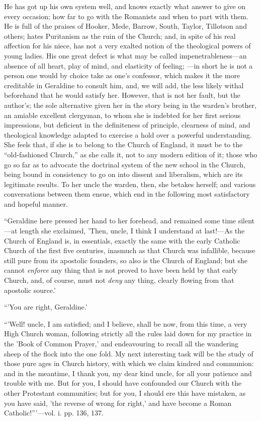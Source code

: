 He has got up his own system well, and knows
exactly what answer to give on every occasion; how far to go with the
Romanists and when to part with them. He is full of the praises of
Hooker, Mede, Barrow, South, Taylor, Tillotson and others; hates
Puritanism as the ruin of the Church; and, in spite of his real
affection for his niece, has not a very exalted notion of the
theological powers of young ladies. His one great defect is what may be
called impenetrableness—an absence of all heart, play of mind,
and elasticity of feeling; —in short he is not a person one would by
choice take as one's confessor, which makes it the more creditable in
Geraldine to consult him, and, we will add, the less likely withal
beforehand that he would satisfy her. However, that is not her fault,
but the author's; the sole alternative given her in the story being in
the warden's brother, an amiable excellent clergyman, to whom she is
indebted for her first serious impressions, but deficient in the
definiteness of principle, clearness of mind, and theological knowledge
adapted to exercise a hold over a powerful understanding. She feels
that, if she is to belong to the Church of England, it must be to the ``old-fashioned
Church,'' as she calls it, not to any modern edition of it; those who go
so far as to advocate the doctrinal system of the new school in the
Church, being bound in consistency to go on into dissent and liberalism,
which are its legitimate results. To her uncle the warden, then, she
betakes herself; and various conversations between them ensue, which end
in the following most satisfactory and hopeful manner.

``Geraldine here pressed her hand to
her forehead, and remained some time silent—at length she exclaimed, 'Then,
uncle, I think I understand at last!—As the Church of England is, in
essentials, exactly the same with the early Catholic Church of the first
five centuries, inasmuch as that Church was infallible, because still
pure from its apostolic founders, so also is the Church of England; but
she cannot \emph{enforce} any thing that is not proved to have been held
by that early Church, and, of course, must not \emph{deny} any thing,
clearly flowing from that apostolic source.'

``'You are right, Geraldine.'

``'Well! uncle, I am satisfied; and I
believe, shall be now, from this time, a very High Church woman,
following strictly all the rules laid down for my practice in the 'Book
of Common Prayer,' and endeavouring to recall all the wandering sheep of
the flock into the one fold. My next interesting task will be the study
of those pure ages in Church history, with which we claim kindred and
communion: and in the meantime, I thank you, my dear kind uncle, for all
your patience and trouble with me. But for you, I should have confounded
our Church with the other Protestant communities; but for you, I should
ere this have mistaken, as you have said, 'the reverse of wrong for
right,' and have become a Roman Catholic!'''—vol. i. pp. 136, 137.

